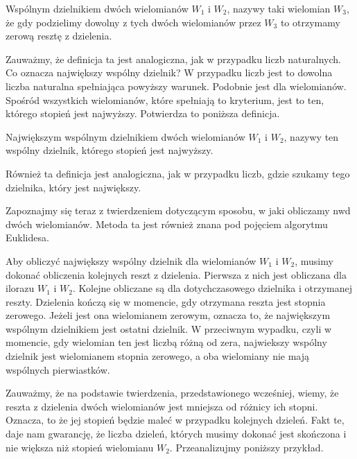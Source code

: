\begin{definition}
	$ $\\
	Wspólnym dzielnikiem dwóch wielomianów $W_1$ i $W_2$, nazywy taki wielomian $W_3$, że gdy podzielimy dowolny z tych dwóch wielomianów przez $W_3$ to otrzymamy zerową resztę z dzielenia.
\end{definition}

Zauważmy, że definicja ta jest analogiczna, jak w przypadku liczb naturalnych.
Co oznacza największy wspólny dzielnik? W przypadku liczb jest to dowolna liczba naturalna spełniająca powyższy warunek. Podobnie jest dla wielomianów. Spośród wszystkich wielomianów, które spełniają to kryterium, jest to ten, którego stopień jest najwyższy. Potwierdza to poniższa definicja.

\begin{definition}
	$ $\\
	Największym wspólnym dzielnikiem dwóch wielomianów $W_1$ i $W_2$, nazywy ten wspólny dzielnik, którego stopień jest najwyższy.
\end{definition}

Również ta definicja jest analogiczna, jak w przypadku liczb, gdzie szukamy tego dzielnika, który jest największy.

Zapoznajmy się teraz z twierdzeniem dotyczącym sposobu, w jaki obliczamy nwd dwóch wielomianów. Metoda ta jest również znana pod pojęciem algorytmu Euklidesa.

\begin{theorem}
	$ $\\
	Aby obliczyć największy wspólny dzielnik dla wielomianów $W_1$ i $W_2$, musimy dokonać obliczenia kolejnych reszt z dzielenia. Pierwsza z nich jest obliczana dla ilorazu $W_1$ i $W_2$. Kolejne obliczane są dla dotychczasowego dzielnika i otrzymanej reszty. Dzielenia kończą się w momencie, gdy otrzymana reszta jest stopnia zerowego. Jeżeli jest ona wielomianem zerowym, oznacza to, że największym wspólnym dzielnikiem jest ostatni dzielnik. W przeciwnym wypadku, czyli w momencie, gdy wielomian ten jest liczbą różną od zera, najwiekszy wspólny dzielnik jest wielomianem stopnia zerowego, a oba wielomiany nie mają wspólnych pierwiastków. 
\end{theorem}

Zauważmy, że na podstawie twierdzenia, przedstawionego wcześniej, wiemy, że reszta z dzielenia dwóch wielomianów jest mniejsza od różnicy ich stopni. Oznacza, to że jej stopień będzie maleć w przypadku kolejnych dzieleń. Fakt te, daje nam gwarancję, że liczba dzieleń, których musimy dokonać jest skończona i nie większa niż stopień wielomianu $W_2$. Przeanalizujmy poniższy przykład.

